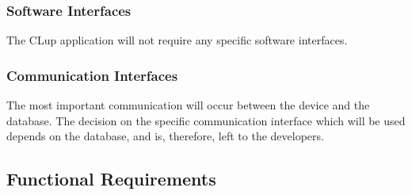 \subsubsection{Software Interfaces}
\hspace{\parindent}The CLup application will not require any specific software interfaces.
\subsubsection{Communication Interfaces}
\hspace{\parindent}The most important communication will occur between the device and the database. The decision on the specific communication interface which will be used depends on the database, and is, therefore, left to the developers.

\newpage
\subsection{Functional Requirements}

